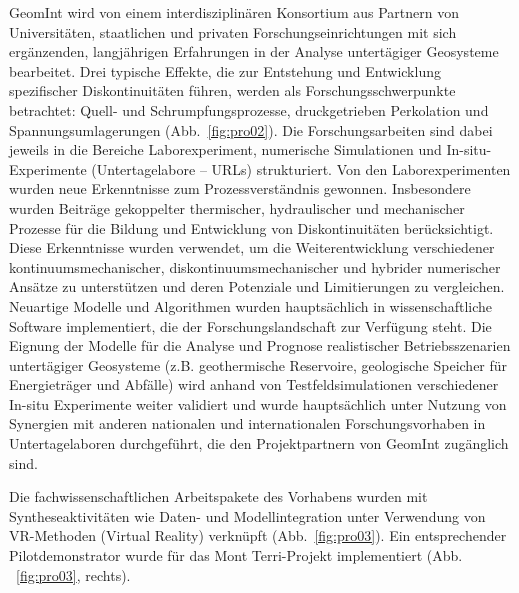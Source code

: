 GeomInt wird von einem interdisziplinären Konsortium aus Partnern von Universitäten, staatlichen und privaten Forschungseinrichtungen mit sich ergänzenden, langjährigen Erfahrungen in der Analyse untertägiger Geosysteme bearbeitet. Drei typische Effekte, die zur Entstehung und Entwicklung spezifischer Diskontinuitäten führen, werden als Forschungsschwerpunkte betrachtet: Quell- und Schrumpfungsprozesse, druckgetrieben Perkolation und Spannungsumlagerungen (Abb.~\ref{fig:pro02}). 
Die Forschungsarbeiten sind dabei jeweils in die Bereiche Laborexperiment, numerische Simulationen und In-situ-Experimente (Untertagelabore – URLs) strukturiert. Von den Laborexperimenten wurden neue Erkenntnisse zum Prozessverständnis gewonnen. Insbesondere wurden Beiträge gekoppelter thermischer, hydraulischer und mechanischer Prozesse für die Bildung und Entwicklung von Diskontinuitäten berücksichtigt. Diese Erkenntnisse wurden verwendet, um die Weiterentwicklung verschiedener kontinuumsmechanischer, diskontinuumsmechanischer und hybrider numerischer Ansätze zu unterstützen und deren Potenziale und Limitierungen zu vergleichen. Neuartige Modelle und Algorithmen wurden hauptsächlich in wissenschaftliche Software implementiert, die der Forschungslandschaft zur Verfügung steht. Die Eignung der Modelle für die Analyse und Prognose realistischer Betriebsszenarien untertägiger Geosysteme (z.B. geothermische Reservoire, geologische Speicher für Energieträger und Abfälle) wird anhand von Testfeldsimulationen verschiedener In-situ Experimente weiter validiert und wurde hauptsächlich unter Nutzung von Synergien mit anderen nationalen und internationalen Forschungsvorhaben in Untertagelaboren durchgeführt, die den Projektpartnern von GeomInt zugänglich sind.

Die fachwissenschaftlichen Arbeitspakete des Vorhabens wurden mit Syntheseaktivitäten wie Daten- und Modellintegration unter Verwendung von VR-Methoden (Virtual Reality) verknüpft (Abb.~\ref{fig:pro03}).
Ein entsprechender Pilotdemonstrator wurde für das Mont Terri-Projekt implementiert (Abb. ~\ref{fig:pro03}, rechts).


